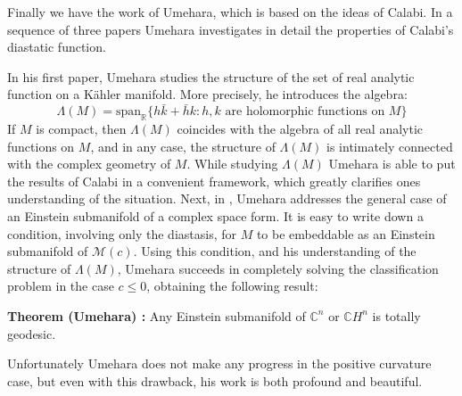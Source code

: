 \documentclass[11pt]{amsart}
\theoremstyle{definition}
\def \C{ \mathbb{C} }
\def \CH{ \mathbb{C}H }
\def \Mamb{ \mathcal{M} }
\begin{document}
Finally we have the work of Umehara, which is based on the ideas of Calabi.  In a sequence of three papers \cite{Um1} \cite{Um2} Umehara investigates in detail the properties of Calabi's diastatic function.  

In his first paper, Umehara studies the structure of the set of real analytic function on a K\"{a}hler manifold.  More precisely, he introduces the algebra:
%
$$ \Lambda( M ) = \text{span}_{\mathbb{R}} \{ h \bar{k} + \bar{h} k : h, k \text{ are holomorphic functions on } M \} $$
%
If $M$ is compact, then $\Lambda(M)$ coincides with the algebra of all real analytic functions on $M$, and in any case, the structure of $\Lambda(M)$ is intimately connected with the complex geometry of $M$.  While studying $\Lambda(M)$ Umehara is able to put the results of Calabi in a convenient framework, which greatly clarifies ones understanding of the situation.  Next, in \cite{Um2}, Umehara addresses the general case of an Einstein submanifold of a complex space form.  It is easy to write down a condition, involving only the diastasis, for $M$ to be embeddable as an Einstein submanifold of $\Mamb(c)$.  Using this condition, and his understanding of the structure of $\Lambda(M)$, Umehara succeeds in completely solving the classification problem in the case $c \leq 0$, obtaining the following result:

{\bf Theorem (Umehara) :} Any Einstein submanifold of $\C^n$ or $\CH^n$ is totally geodesic.

Unfortunately Umehara does not make any progress in the positive curvature case, but even with this drawback, his work is both profound and beautiful.
\end{document}

